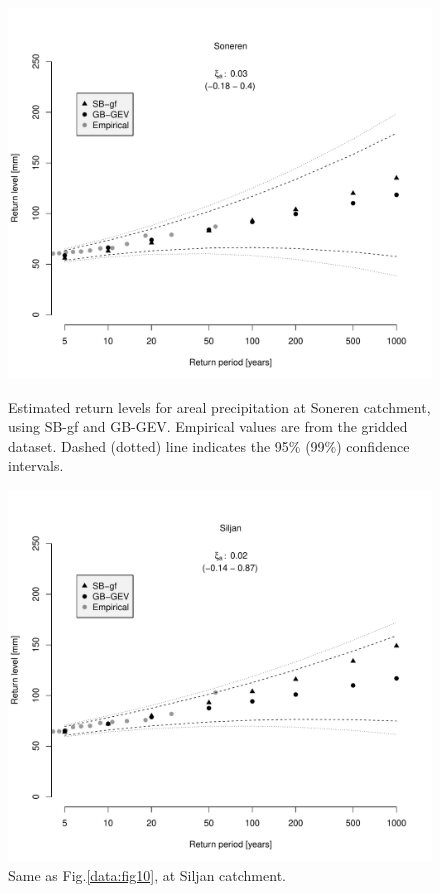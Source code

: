 \documentclass[12pt,a4paper,english]{article}
\begin{document}
\begin{figure}[!htbp]
\begin{minipage}[t]{0.50\textwidth}
\centering
\includegraphics[width = \linewidth]{Figs/compareMT_Soneren.pdf}
\caption[]{\label{data:fig11}Estimated return levels for areal precipitation at Soneren catchment, using SB-gf and GB-GEV. Empirical values are from the gridded dataset. Dashed (dotted) line indicates the 95\% (99\%) confidence intervals.}
\end{minipage}
\hspace{10mm}
\begin{minipage}[t]{0.50\textwidth}
\centering
\includegraphics[width = \linewidth]{Figs/compareMT_Siljan.pdf}
\caption[]{\label{data:fig12}Same as Fig.\ref{data:fig10}, at Siljan catchment.}
\end{minipage}
\end{figure}
\end{document}

